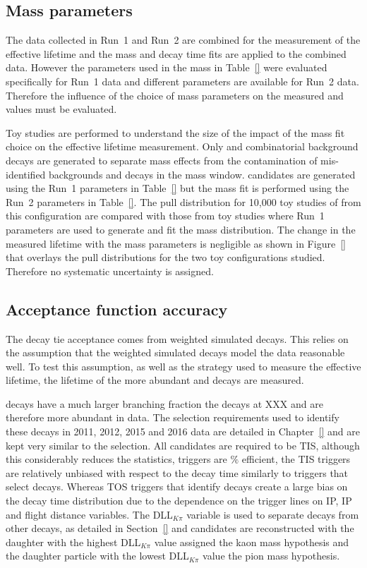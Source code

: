 \subsection{Mass \pdf parameters}
\label{sec:massPDFsyst}
The data collected in Run~1 and Run~2 are combined for the measurement of the \bsmumu effective lifetime and the mass and decay time fits are applied to the combined data. However the parameters used in the mass \pdf in Table~\ref{} were evaluated specifically for Run~1 data and different parameters are available for Run~2 data. Therefore the influence of the choice of mass \pdf parameters on the measured \tmumu and \Gmumu values must be evaluated. 

Toy studies are performed to understand the size of the impact of the mass fit choice on the effective lifetime measurement. Only \bsmumu and combinatorial background decays are generated to separate mass \pdf effects from the contamination of mis-identified backgrounds and \bdmumu decays in the mass window. \bsmumu candidates are generated using the Run~1 parameters in Table~\ref{} but the mass fit is performed using the Run~2 parameters in Table~\ref{}. The pull distribution for 10,000 toy studies of \Gmumu from this configuration are compared with those from toy studies where Run~1 parameters are used to generate and fit the mass distribution. The change in the measured lifetime with the mass \pdf parameters is negligible as shown in Figure~\ref{} that overlays the pull distributions for the two toy configurations studied. Therefore no systematic uncertainty is assigned. 

\subsection{Acceptance function accuracy}
\label{sec:accptsyst}
The decay tie acceptance comes from weighted simulated decays. This relies on the assumption that the weighted simulated decays model the data reasonable well. To test this assumption, as well as the strategy used to measure the \bsmumu effective lifetime, the lifetime of the more abundant \bdkpi and \bskk decays are measured.

\bdkpi decays have a much larger branching fraction the \bsmumu decays at XXX and are therefore more abundant in data. The selection requirements used to identify these decays in 2011, 2012, 2015 and 2016 data are detailed in Chapter~\ref{} and are kept very similar to the \bsmumu selection. All candidates are required to be TIS, although this considerably reduces the statistics, \bhh triggers are $\%$ efficient, the TIS triggers are relatively unbiased with respect to the decay time similarly to triggers that select \bsmumu decays. Whereas TOS triggers that identify \bhh decays create a large bias on the decay time distribution due to the dependence on the trigger lines on IP, IP \chisqd and flight distance variables. The DLL$_{K\pi}$ variable is used to separate \bdkpi decays from other \bhh decays, as detailed in Section~\ref{} and candidates are reconstructed with the daughter with the highest DLL$_{K\pi}$ value assigned the kaon mass hypothesis and the daughter particle with the lowest DLL$_{K\pi}$ value the pion mass hypothesis.

